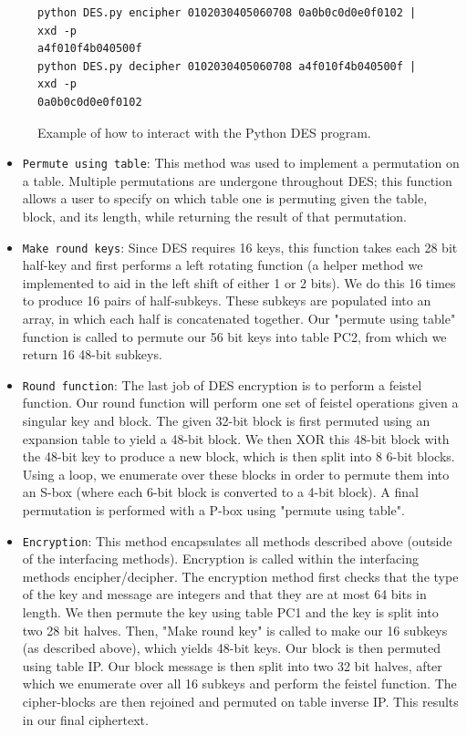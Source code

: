 \documentclass[acmlarge]{acmart}
\begin{document}
\begin{figure}
\centering
\begin{BVerbatim}
python DES.py encipher 0102030405060708 0a0b0c0d0e0f0102 | xxd -p
a4f010f4b040500f
python DES.py decipher 0102030405060708 a4f010f4b040500f | xxd -p
0a0b0c0d0e0f0102
\end{BVerbatim}
\caption{Example of how to interact with the Python DES program.}
\label{fig:despython}
\end{figure}

\begin{itemize}
	\item \texttt{Permute using table}: This method was used to implement a permutation on a table. Multiple permutations are undergone throughout DES; this function allows a user to specify on which table one is permuting given the table, block, and its length, while returning the result of that permutation.
	\item \texttt{Make round keys}: Since DES requires 16 keys, this function takes each 28 bit half-key and first performs a left rotating function (a helper method we implemented to aid in the left shift of either 1 or 2 bits). We do this 16 times to produce 16 pairs of half-subkeys. These subkeys are populated into an array, in which each half is concatenated together. Our "permute using table" function is called to permute our 56 bit keys into table PC2, from which we return 16 48-bit subkeys.
	\item \texttt{Round function}: The last job of DES encryption is to perform a feistel function. Our round function will perform one set of feistel operations given a singular key and block. The given 32-bit block is first permuted using an expansion table to yield a 48-bit block. We then XOR this 48-bit block with the 48-bit key to produce a new block, which is then split into 8 6-bit blocks. Using a loop, we enumerate over these blocks in order to permute them into an S-box (where each 6-bit block is converted to a 4-bit block). A final permutation is performed with a P-box using "permute using table". 
	\item \texttt{Encryption}: This method encapsulates all methods described above (outside of the interfacing methods). Encryption is called within the interfacing methods encipher/decipher. The encryption method first checks that the type of the key and message are integers and that they are at most 64 bits in length. We then permute the key using table PC1 and the key is split into two 28 bit halves. Then, "Make round key" is called to make our 16 subkeys (as described above), which yields 48-bit keys. Our block is then permuted using table IP. Our block message is then split into two 32 bit halves, after which we enumerate over all 16 subkeys and perform the feistel function. The cipher-blocks are then rejoined and permuted on table inverse IP. This results in our final ciphertext. 
\end{itemize}
\end{document}
